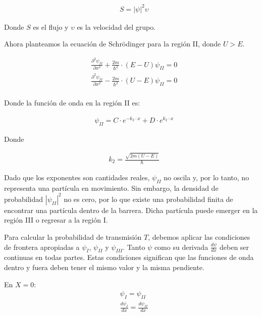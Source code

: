 \documentclass[a4paper]{article}
\begin{document}
            \begin{align*}
                &S = \left| \psi \right|^{2}\upsilon 
            \end{align*}

            \indent Donde $S$ es el flujo y $\upsilon$ es la velocidad del grupo.

            \indent Ahora planteamos la ecuación de Schrödinger para la región II, donde $U>E$.

            \begin{align*}
                &\frac{\partial^2 \psi_{II}} {\partial x^2} + \frac{2m}{\hbar^2} \cdot (E - U) \psi_{II} = 0 \\
                &\frac{\partial^2 \psi_{II}} {\partial x^2} - \frac{2m}{\hbar^2} \cdot (U - E) \psi_{II} = 0 \\
            \end{align*}

            \indent Donde la función de onda en la región II es:

              \begin{align*}
                &\psi_{II} = C \cdot e^{-k_2 \cdot x} + D \cdot e^{k_2 \cdot x}
            \end{align*}

            \indent Donde

            \begin{align*}
                &k_2 = \frac{\sqrt{2m(U - E)}}{\hbar}
            \end{align*}

            \indent Dado que los exponentes son cantidades reales, $\psi_{II}$ no oscila y, por lo tanto, no representa una partícula en movimiento. Sin embargo, la densidad de probabilidad $|\psi_{II}|^2$ no es cero, por lo que existe una probabilidad finita de encontrar una partícula dentro de la barrera. Dicha partícula puede emerger en la región III o regresar a la región I.

            \indent Para calcular la probabilidad de transmisión \( T \), debemos aplicar las condiciones de frontera apropiadas a \( \psi_I \), \( \psi_{II} \) y \( \psi_{III} \). Tanto \( \psi \) como su derivada \( \frac{d\psi}{dx} \) deben ser continuas en todas partes. Estas condiciones significan que las funciones de onda dentro y fuera deben tener el mismo valor y la misma pendiente.

            \indent En $X=0$:
         \begin{align*}
                &\psi_I = \psi_{II} \\
                &\frac{d\psi_I}{dx} = \frac{d\psi_{II}}{dx} \\
            \end{align*}
\end{document}
